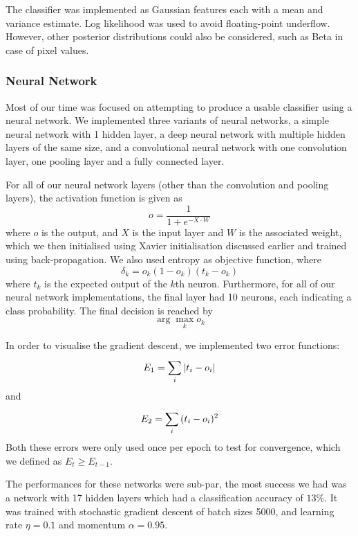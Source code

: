 \documentclass{article} %
\begin{document}
The classifier was implemented as Gaussian features each with a mean and variance estimate. Log likelihood was used to avoid floating-point underflow. However, other posterior distributions could also be considered, such as Beta in case of pixel values.

\subsubsection{Neural Network}
Most of our time was focused on attempting to produce a usable classifier using a neural network. We implemented three variants of neural networks, a simple neural network with 1 hidden layer, a deep neural network with multiple hidden layers of the same size, and a convolutional neural network with one convolution layer, one pooling layer and a fully connected layer.

For all of our neural network layers (other than the convolution and pooling layers), the activation function is given as
$$o = \frac{1}{1+e^{-X\cdot W}}$$
where $o$ is the output, and $X$ is the input layer and $W$ is the associated weight, which we then initialised using Xavier initialisation discussed earlier and trained using back-propagation.
We also used entropy as objective function, where
$$\delta_k = o_k(1-o_k)(t_k-o_k)$$
where $t_k$ is the expected output of the $k$th neuron. Furthermore, for all of our neural network implementations, the final layer had 10 neurons, each indicating a class probability. The final decision is reached by 
$$\arg\max_k o_k$$

In order to visualise the gradient descent, we implemented two error functions:
  $$E_1 = \sum^{}_{i}{|t_i-o_i|}$$
and
  $$E_2 = \sum^{}_{i}{(t_i-o_i)^2}$$
Both these errors were only used once per epoch to test for convergence, which we defined as $E_{t}\geq E_{t-1}$.

The performances for these networks were sub-par, the most success we had was a network with 17 hidden layers which had a classification accuracy of $13\%$. It was trained with stochastic gradient descent of batch sizes 5000, and learning rate $\eta=0.1$ and momentum $\alpha=0.95$.
\end{document}
